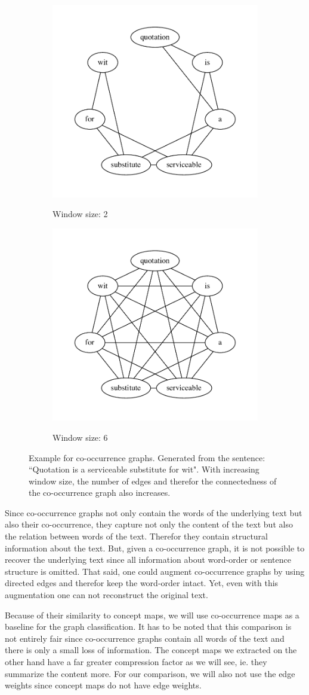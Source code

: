 \begin{figure}[htb!]
\begin{subfigure}[t]{0.33\linewidth}{\includegraphics[width=\linewidth]{assets/figures/cooccurrence/window_size_2.pdf}}
    \caption{Window size: 2}%
    \end{subfigure}
    \begin{subfigure}[t]{0.33\linewidth}{\includegraphics[width=\linewidth]{assets/figures/cooccurrence/window_size_6.pdf}}%
    \caption{Window size: 6}%
    \end{subfigure}
    \caption[Example: Co-Occurrence Graph]{Example for co-occurrence graphs. Generated from the sentence: ``Quotation is a serviceable substitute for wit". With increasing window size, the number of edges and therefor the connectedness of the co-occurrence graph also increases.}%
    \label{fig:cooccurrence_graphs}%
\end{figure}

Since co-occurrence graphs not only contain the words of the underlying text but also their co-occurrence, they capture not only the content of the text but also the relation between words of the text.
Therefor they contain structural information about the text.
But, given a co-occurrence graph, it is not possible to recover the underlying text since all information about word-order or sentence structure is omitted.
That said, one could augment co-occurrence graphs by using directed edges and therefor keep the word-order intact.
Yet, even with this augmentation one can not reconstruct the original text.

Because of their similarity to concept maps, we will use co-occurrence maps as a baseline for the graph classification.
It has to be noted that this comparison is not entirely fair since co-occurrence graphs contain all words of the text and there is only a small loss of information.
The concept maps we extracted on the other hand have a far greater compression factor as we will see, ie. they summarize the content more.
For our comparison, we will also not use the edge weights since concept maps do not have edge weights.


